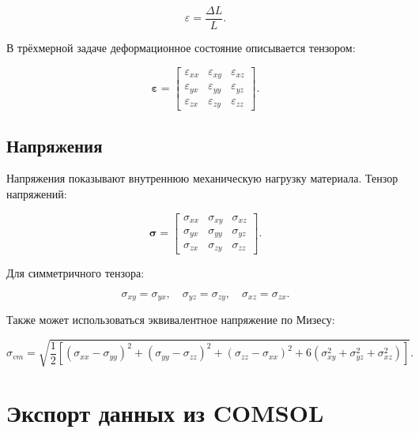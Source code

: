 \begin{equation}
\varepsilon=\frac{\Delta L}{L}.
\end{equation}

В трёхмерной задаче деформационное состояние описывается тензором:

\begin{equation}
\boldsymbol{\varepsilon}=\begin{bmatrix}
\varepsilon_{xx} & \varepsilon_{xy} & \varepsilon_{xz} \\
\varepsilon_{yx} & \varepsilon_{yy} & \varepsilon_{yz} \\
\varepsilon_{zx} & \varepsilon_{zy} & \varepsilon_{zz}
\end{bmatrix}.
\end{equation}

\subsection{Напряжения}

Напряжения показывают внутреннюю механическую нагрузку материала. Тензор напряжений:

\begin{equation}
\boldsymbol{\sigma}=\begin{bmatrix}
\sigma_{xx} & \sigma_{xy} & \sigma_{xz} \\
\sigma_{yx} & \sigma_{yy} & \sigma_{yz} \\
\sigma_{zx} & \sigma_{zy} & \sigma_{zz}
\end{bmatrix}.
\end{equation}

Для симметричного тензора:

\begin{equation}
\sigma_{xy}=\sigma_{yx}, \quad
\sigma_{yz}=\sigma_{zy}, \quad
\sigma_{xz}=\sigma_{zx}.
\end{equation}

Также может использоваться эквивалентное напряжение по Мизесу:

\begin{equation}
\sigma_{vm}=\sqrt{\frac{1}{2}\left[(\sigma_{xx}-\sigma_{yy})^2+(\sigma_{yy}-\sigma_{zz})^2+(\sigma_{zz}-\sigma_{xx})^2+6(\sigma_{xy}^2+\sigma_{yz}^2+\sigma_{xz}^2)\right]}.
\end{equation}

\section{Экспорт данных из COMSOL}

